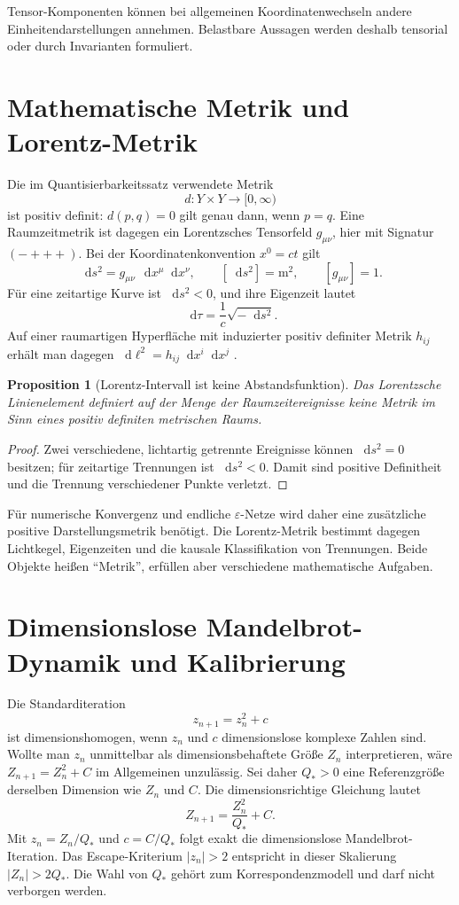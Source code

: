 \documentclass[11pt,a4paper]{article}
\newtheorem{proposition}{Proposition}[section]
\theoremstyle{remark}
\newcommand{\eps}{\varepsilon}
\newcommand{\dd}{\mathop{}\!\mathrm{d}}
\begin{document}
Tensor-Komponenten können bei allgemeinen Koordinatenwechseln andere
Einheitendarstellungen annehmen. Belastbare Aussagen werden deshalb
tensorial oder durch Invarianten formuliert.

\section{Mathematische Metrik und Lorentz-Metrik}
\label{sec:metriken-physik}

Die im Quantisierbarkeitssatz verwendete Metrik
\[
  d:Y\times Y\longrightarrow[0,\infty)
\]
ist positiv definit: \(d(p,q)=0\) gilt genau dann, wenn \(p=q\). Eine
Raumzeitmetrik ist dagegen ein Lorentzsches Tensorfeld \(g_{\mu\nu}\), hier
mit Signatur \((-+++)\). Bei der Koordinatenkonvention \(x^0=ct\) gilt
\[
  \dd s^2=g_{\mu\nu}\,\dd x^\mu\dd x^\nu,
  \qquad [\dd s^2]=\mathrm{m^2},
  \qquad [g_{\mu\nu}]=1.
\]
Für eine zeitartige Kurve ist \(\dd s^2<0\), und ihre Eigenzeit lautet
\[
  \dd\tau=\frac{1}{c}\sqrt{-\dd s^2}.
\]
Auf einer raumartigen Hyperfläche mit induzierter positiv definiter Metrik
\(h_{ij}\) erhält man dagegen \(\dd\ell^2=h_{ij}\dd x^i\dd x^j\)
\citep{wald1984}.

\begin{proposition}[Lorentz-Intervall ist keine Abstandsfunktion]
Das Lorentzsche Linienelement definiert auf der Menge der
Raumzeitereignisse keine Metrik im Sinn eines positiv definiten metrischen
Raums.
\end{proposition}

\begin{proof}
Zwei verschiedene, lichtartig getrennte Ereignisse können \(\dd s^2=0\)
besitzen; für zeitartige Trennungen ist \(\dd s^2<0\). Damit sind positive
Definitheit und die Trennung verschiedener Punkte verletzt.
\end{proof}

Für numerische Konvergenz und endliche \(\eps\)-Netze wird daher eine
zusätzliche positive Darstellungsmetrik benötigt. Die Lorentz-Metrik bestimmt
dagegen Lichtkegel, Eigenzeiten und die kausale Klassifikation von
Trennungen. Beide Objekte heißen ``Metrik'', erfüllen aber verschiedene
mathematische Aufgaben.

\section{Dimensionslose Mandelbrot-Dynamik und Kalibrierung}
\label{sec:nondimensionalisierung}

Die Standarditeration
\[
  z_{n+1}=z_n^2+c
\]
ist dimensionshomogen, wenn \(z_n\) und \(c\) dimensionslose komplexe Zahlen
sind. Wollte man \(z_n\) unmittelbar als dimensionsbehaftete Größe \(Z_n\)
interpretieren, wäre \(Z_{n+1}=Z_n^2+C\) im Allgemeinen unzulässig. Sei
daher \(Q_*>0\) eine Referenzgröße derselben Dimension wie \(Z_n\) und
\(C\). Die dimensionsrichtige Gleichung lautet
\[
  Z_{n+1}=\frac{Z_n^2}{Q_*}+C.
\]
Mit \(z_n=Z_n/Q_*\) und \(c=C/Q_*\) folgt exakt die dimensionslose
Mandelbrot-Iteration. Das Escape-Kriterium \(|z_n|>2\) entspricht in dieser
Skalierung \(|Z_n|>2Q_*\). Die Wahl von \(Q_*\) gehört zum
Korrespondenzmodell und darf nicht verborgen werden.
\end{document}

